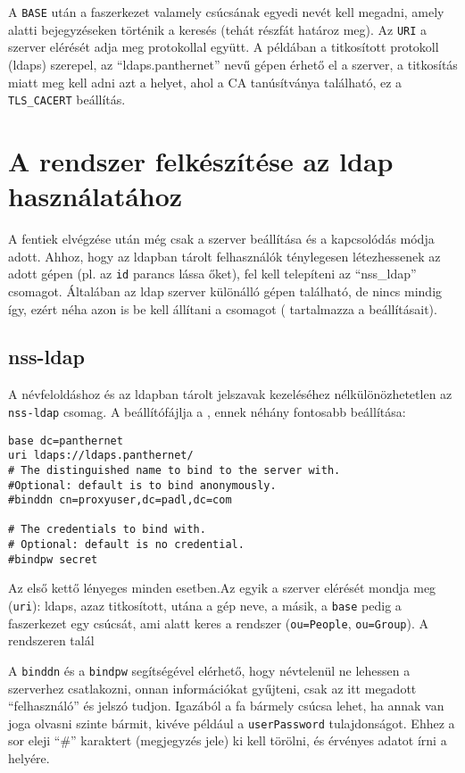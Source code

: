 A \texttt{BASE} után a faszerkezet valamely csúcsának egyedi nevét kell megadni, amely alatti bejegyzéseken történik a
keresés (tehát részfát határoz meg). Az \texttt{URI} a szerver elérését adja meg protokollal együtt. A példában
a titkosított protokoll (ldaps) szerepel, az ``ldaps.panthernet'' nevű gépen érhető el a szerver, a titkosítás miatt meg
kell adni azt a helyet, ahol a CA tanúsítványa található, ez a \texttt{TLS\_CACERT} beállítás.

\section{A rendszer felkészítése az ldap használatához}
A fentiek elvégzése után még csak a szerver beállítása és a kapcsolódás módja adott. Ahhoz, hogy az ldapban tárolt
felhasználók ténylegesen létezhessenek az adott gépen (pl. az \texttt{id} parancs lássa őket), fel kell telepíteni 
az ``nss\_ldap'' csomagot. Általában az ldap
szerver különálló gépen található, de nincs mindig így, ezért néha azon is be kell állítani a csomagot
( tartalmazza a beállításait).

\subsection{nss-ldap}
A névfeloldáshoz és az ldapban tárolt jelszavak kezeléséhez nélkülönözhetetlen az \texttt{nss-ldap} csomag. A
beállítófájlja a , ennek néhány fontosabb beállítása:

\begin{Verbatim}[frame=single,label=/etc/ldap.conf részlet]
base dc=panthernet
uri ldaps://ldaps.panthernet/
# The distinguished name to bind to the server with.
#Optional: default is to bind anonymously.
#binddn cn=proxyuser,dc=padl,dc=com
  
# The credentials to bind with.
# Optional: default is no credential.
#bindpw secret
\end{Verbatim}

Az első kettő lényeges minden esetben.Az egyik a szerver elérését mondja meg (\texttt{uri}): ldaps, azaz titkosított,
utána a gép neve, a másik, a \texttt{base} pedig a faszerkezet egy csúcsát, ami alatt keres a rendszer
(\texttt{ou=People}, \texttt{ou=Group}). A rendszeren talál

A \texttt{binddn} és a \texttt{bindpw} segítségével elérhető, hogy névtelenül ne lehessen a szerverhez csatlakozni,
onnan információkat gyűjteni, csak az itt megadott ``felhasználó'' és jelszó tudjon. Igazából a fa bármely csúcsa
lehet, ha annak van joga olvasni szinte bármit, kivéve például a \texttt{userPassword} tulajdonságot. Ehhez a sor
eleji ``\#'' karaktert (megjegyzés jele) ki kell törölni, és érvényes adatot írni a helyére.

